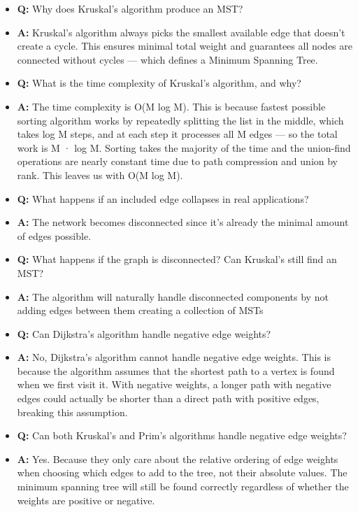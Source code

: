 \documentclass[11pt,a4paper]{article}
\begin{document}
\begin{multicols}{2}
\begin{itemize}
    \item \textbf{Q:} Why does Kruskal's algorithm produce an MST?
    \item \textbf{A:} Kruskal's algorithm always picks the smallest available edge that doesn't create a cycle. This ensures minimal total weight and guarantees all nodes are connected without cycles — which defines a Minimum Spanning Tree.

    \item \textbf{Q:} What is the time complexity of Kruskal's algorithm, and why?
    \item \textbf{A:} The time complexity is O(M log M). This is because fastest possible sorting algorithm works by repeatedly splitting the list in the middle, which takes log M steps, and at each step it processes all M edges — so the total work is M · log M. Sorting takes the majority of the time and the union-find operations are nearly constant time due to path compression and union by rank. This leaves us with O(M log M).

    \item \textbf{Q:} What happens if an included edge collapses in real applications?
    \item \textbf{A:} The network becomes disconnected since it's already the minimal amount of edges possible.

    \item \textbf{Q:} What happens if the graph is disconnected? Can Kruskal's still find an MST?
    \item \textbf{A:} The algorithm will naturally handle disconnected components by not adding edges between them creating a collection of MSTs

    \item \textbf{Q:} Can Dijkstra's algorithm handle negative edge weights?
    \item \textbf{A:} No, Dijkstra's algorithm cannot handle negative edge weights. This is because the algorithm assumes that the shortest path to a vertex is found when we first visit it. With negative weights, a longer path with negative edges could actually be shorter than a direct path with positive edges, breaking this assumption.

    \item \textbf{Q:} Can both Kruskal's and Prim's algorithms handle negative edge weights?
    \item \textbf{A:} Yes. Because they only care about the relative ordering of edge weights when choosing which edges to add to the tree, not their absolute values. The minimum spanning tree will still be found correctly regardless of whether the weights are positive or negative.
\end{itemize}


\end{multicols}
\end{document}
